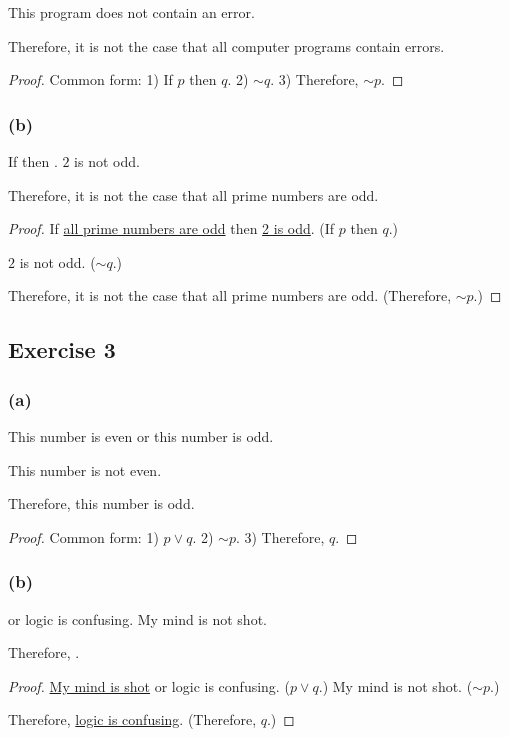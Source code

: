 \documentclass[14pt]{extarticle}
\begin{document}
This program does not contain an error.

Therefore, it is not the case that all computer programs contain errors.

\begin{proof} Common form: 1) If $p$ then $q$. 2) $\sim q$. 3) Therefore, $\sim
p$. \end{proof}

\subsubsection{(b)} If \fbl then \fbl.
$2$ is not odd.

Therefore, it is not the case that all prime numbers are odd.

\begin{proof} If \underline{all prime numbers are odd} then \underline{2 is
odd}. (If $p$ then $q$.)

$2$ is not odd. ($\sim q$.)

Therefore, it is not the case that all prime numbers are odd. (Therefore, $\sim
p$.) \end{proof}

\subsection{Exercise 3} \subsubsection{(a)} This number is even or this number
is odd.

This number is not even.

Therefore, this number is odd.

\begin{proof} Common form: 1) $p \vee q$. 2) $\sim p$. 3) Therefore, $q$.
\end{proof}

\subsubsection{(b)} \fbl or logic is confusing.
My mind is not shot.

Therefore, \fbl.

\begin{proof} \underline{My mind is shot} or logic is confusing. ($p \vee q$.)
My mind is not shot. ($\sim p$.)

Therefore, \underline{logic is confusing}. (Therefore, $q$.) \end{proof}
\end{document}
